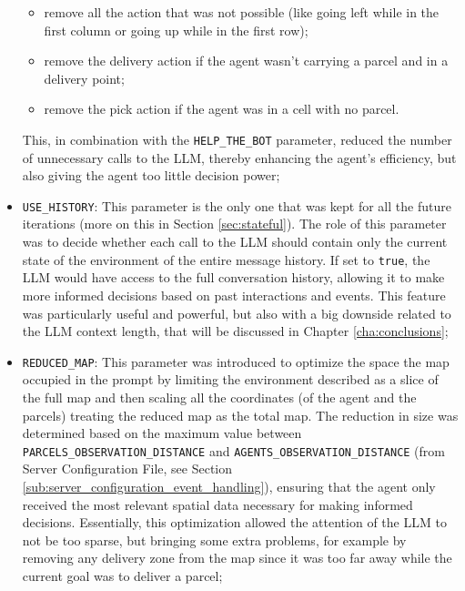 \begin{itemize}
\begin{itemize}
      \item remove all the action that was not possible (like going left while
        in the first column or going up while in the first row);

      \item remove the delivery action if the agent wasn't carrying a parcel and
        in a delivery point;

      \item remove the pick action if the agent was in a cell with no parcel.
    \end{itemize}
    This, in combination with the \texttt{HELP\_THE\_BOT} parameter, reduced the
    number of unnecessary calls to the LLM, thereby enhancing the agent's
    efficiency, but also giving the agent too little decision power;

  \item \texttt{USE\_HISTORY}: This parameter is the only one that was kept for all
    the future iterations (more on this in Section \ref{sec:stateful}). The role
    of this parameter was to decide whether each call to the LLM should contain
    only the current state of the environment of the entire message history. If set
    to \texttt{true}, the LLM would have access to the full conversation history,
    allowing it to make more informed decisions based on past interactions and
    events. This feature was particularly useful and powerful, but also with a
    big downside related to the LLM context length, that will be discussed in Chapter
    \ref{cha:conclusions};

  \item \texttt{REDUCED\_MAP}: This parameter was introduced to optimize the space
    the map occupied in the prompt by limiting the environment described as a slice
    of the full map and then scaling all the coordinates (of the agent and the
    parcels) treating the reduced map as the total map. The reduction in size
    was determined based on the maximum value between \texttt{PARCELS\_OBSERVATION\_DISTANCE}
    and \texttt{AGENTS\_OBSERVATION\_DISTANCE} (from Server Configuration File,
    see Section \ref{sub:server_configuration_event_handling}), ensuring that
    the agent only received the most relevant spatial data necessary for making
    informed decisions. Essentially, this optimization allowed the attention of
    the LLM to not be too sparse, but bringing some extra problems, for example
    by removing any delivery zone from the map since it was too far away while
    the current goal was to deliver a parcel;


\end{itemize}
